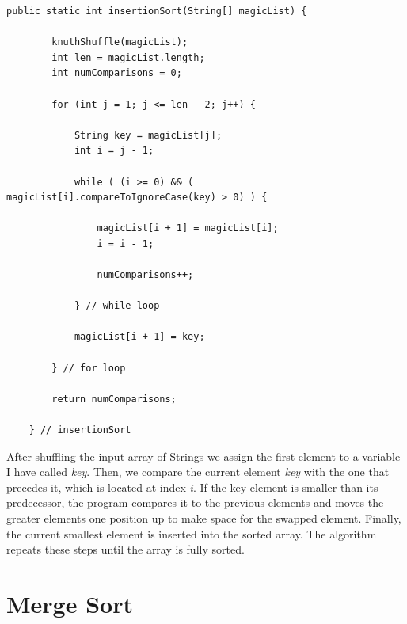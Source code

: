 \documentclass[letterpaper, 10pt]{article}
\begin{document}
\begin{lstlisting}
public static int insertionSort(String[] magicList) {
		
		knuthShuffle(magicList);
		int len = magicList.length;
		int numComparisons = 0;
		
		for (int j = 1; j <= len - 2; j++) {
			
			String key = magicList[j];
			int i = j - 1;
			
			while ( (i >= 0) && ( magicList[i].compareToIgnoreCase(key) > 0) ) {
				
				magicList[i + 1] = magicList[i];
				i = i - 1;
				
				numComparisons++;
				
			} // while loop
			
			magicList[i + 1] = key;
			
		} // for loop
		
		return numComparisons;
		
	} // insertionSort
\end{lstlisting}

After shuffling the input array of Strings we assign the first element to a variable I have called \textit{key}. Then, we compare the current element \textit{key} with the one that precedes it, which is located at index \textit{i}. If the key element is smaller than its predecessor, the program compares it to the previous elements and moves the greater elements one position up to make space for the swapped element. Finally, the current smallest element is inserted into the sorted array. The algorithm repeats these steps until the array is fully sorted.

\pagebreak
\section{Merge Sort}
\end{document}
